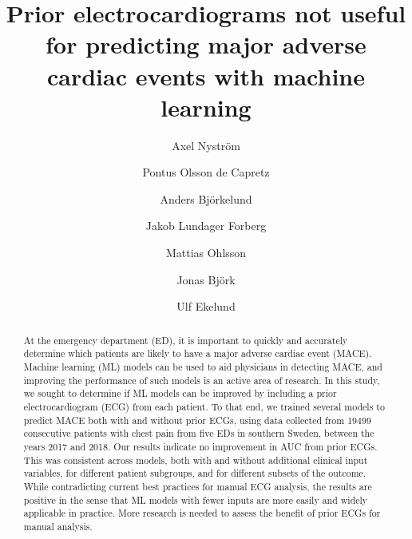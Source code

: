 \documentclass[preprint]{elsarticle}
\begin{document}
\begin{frontmatter}

\title{Prior electrocardiograms not useful for predicting major adverse cardiac events with machine learning}


\author[inst1]{Axel Nystr\"{o}m}
\author[inst2,inst3]{Pontus Olsson de Capretz}
\author[inst4]{Anders Bj\"{o}rkelund}
\author[inst3,inst5]{Jakob Lundager Forberg}
\author[inst4,inst6]{Mattias Ohlsson}
\author[inst1,inst7]{Jonas Bj\"{o}rk}
\author[inst2,inst3]{Ulf Ekelund}


            






\begin{abstract}
At the emergency department (ED), it is important to quickly and accurately determine which patients are likely to have a major adverse cardiac event (MACE). Machine learning (ML) models can be used to aid physicians in detecting MACE, and improving the performance of such models is an active area of research. In this study, we sought to determine if ML models can be improved by including a prior electrocardiogram (ECG) from each patient. To that end, we trained several models to predict MACE both with and without prior ECGs, using data collected from 19499 consecutive patients with chest pain from five EDs in southern Sweden, between the years 2017 and 2018. Our results indicate no improvement in AUC from prior ECGs. This was consistent across models, both with and without additional clinical input variables, for different patient subgroups, and for different subsets of the outcome. While contradicting current best practices for manual ECG analysis, the results are positive in the sense that ML models with fewer inputs  are more easily and widely applicable in practice. More research is needed to assess the benefit of prior ECGs for manual analysis.
\end{abstract}


\end{frontmatter}
\end{document}
